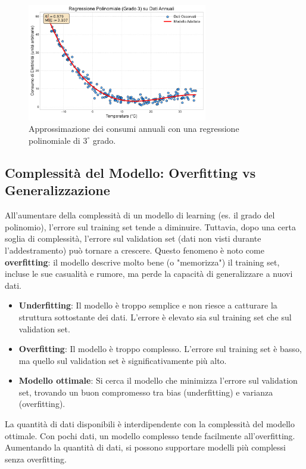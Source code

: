 \documentclass{article}
\begin{document}
\begin{figure}[H]
    \centering
    \includegraphics[width=0.7\textwidth]{images/electricity_yearly_poly3_fit.pdf}
    \caption{Approssimazione dei consumi annuali con una regressione polinomiale di $3^{\circ}$ grado.}
    \label{fig:electricity_yearly_poly3_fit}
\end{figure}

\subsection{Complessità del Modello: Overfitting vs Generalizzazione}
All'aumentare della complessità di un modello di learning (es. il grado del polinomio), l'errore sul training set tende a diminuire. Tuttavia, dopo una certa soglia di complessità, l'errore sul validation set (dati non visti durante l'addestramento) può tornare a crescere. Questo fenomeno è noto come \textbf{overfitting}: il modello descrive molto bene (o "memorizza") il training set, incluse le sue casualità e rumore, ma perde la capacità di generalizzare a nuovi dati.
\begin{itemize}
    \item \textbf{Underfitting}: Il modello è troppo semplice e non riesce a catturare la struttura sottostante dei dati. L'errore è elevato sia sul training set che sul validation set.
    \item \textbf{Overfitting}: Il modello è troppo complesso. L'errore sul training set è basso, ma quello sul validation set è significativamente più alto.
    \item \textbf{Modello ottimale}: Si cerca il modello che minimizza l'errore sul validation set, trovando un buon compromesso tra bias (underfitting) e varianza (overfitting).
\end{itemize}
La quantità di dati disponibili è interdipendente con la complessità del modello ottimale. Con pochi dati, un modello complesso tende facilmente all'overfitting. Aumentando la quantità di dati, si possono supportare modelli più complessi senza overfitting.
\end{document}
